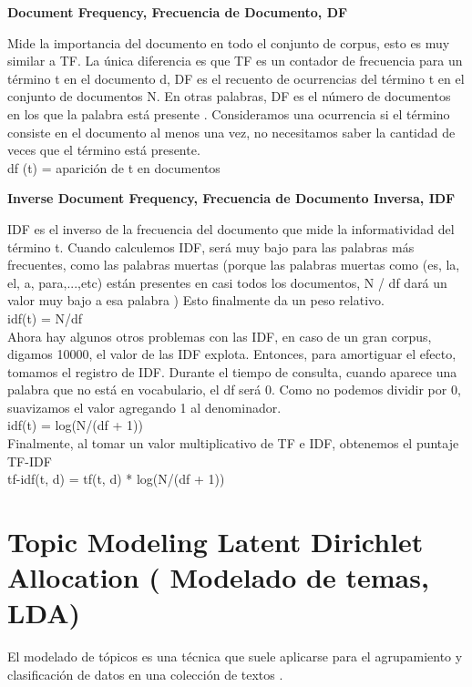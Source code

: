 \textbf{Document Frequency, Frecuencia de Documento, DF}

 Mide la importancia del documento en todo el conjunto de corpus, esto es muy similar a TF.
 La única diferencia es que TF es un contador de frecuencia para un término t en el documento d, 
 DF es el recuento de ocurrencias del término t en el conjunto de documentos N. En otras palabras, 
 DF es el número de documentos en los que la palabra está presente . Consideramos una ocurrencia si el término consiste
 en el documento al menos una vez, no necesitamos saber la cantidad de veces que el término está presente.\\
 
df (t) = aparición de t en documentos


\textbf{Inverse Document Frequency, Frecuencia de Documento Inversa, IDF}


IDF es el inverso de la frecuencia del documento que mide la informatividad del término t. 
Cuando calculemos IDF, será muy bajo para las palabras más frecuentes, como las palabras muertas
(porque las palabras muertas como (es, la, el, a, para,...,etc) están presentes en casi todos los documentos,  N / df dará un valor muy bajo a esa palabra ) 
Esto finalmente da un peso relativo. \\

idf(t) = N/df \\


Ahora hay algunos otros problemas con las IDF, en caso de un gran corpus, digamos 10000, el valor de las IDF explota. 
Entonces, para amortiguar el efecto, tomamos el registro de IDF.
Durante el tiempo de consulta, cuando aparece una palabra que no está en vocabulario, 
el df será 0. Como no podemos dividir por 0, suavizamos el valor agregando 1 al denominador.\\

idf(t) = log(N/(df + 1)) \\

Finalmente, al tomar un valor multiplicativo de TF e IDF, obtenemos el puntaje TF-IDF \\

tf-idf(t, d) = tf(t, d) * log(N/(df + 1))


\section{Topic Modeling Latent Dirichlet Allocation (
Modelado de temas, LDA)}

El modelado de tópicos es una técnica que suele aplicarse para el agrupamiento y
clasificación de datos en una colección de textos \cite{ahmed2012timeline}.


